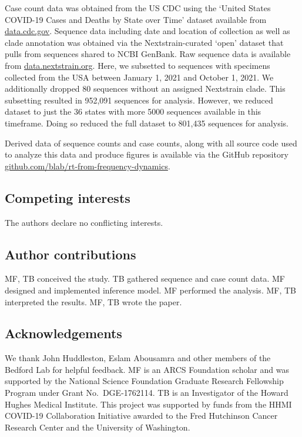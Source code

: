 \documentclass[11pt,oneside,letterpaper]{article}
\begin{document}
Case count data was obtained from the US CDC using the `United States COVID-19 Cases and Deaths by State over Time' dataset available from \href{https://data.cdc.gov/Case-Surveillance/United-States-COVID-19-Cases-and-Deaths-by-State-o/9mfq-cb36}{data.cdc.gov}.
Sequence data including date and location of collection as well as clade annotation was obtained via the Nextstrain-curated `open' dataset \cite{Hadfield2018} that pulls from sequences shared to NCBI GenBank.
Raw sequence data is available from \href{https://docs.nextstrain.org/projects/ncov/en/latest/reference/remote_inputs.html}{data.nextstrain.org}.
Here, we subsetted to sequences with specimens collected from the USA between January 1, 2021 and October 1, 2021.
We additionally dropped 80 sequences without an assigned Nextstrain clade.
This subsetting resulted in 952,091 sequences for analysis.
However, we reduced dataset to just the 36 states with more 5000 sequences available in this timeframe.
Doing so reduced the full dataset to 801,435 sequences for analysis.

Derived data of sequence counts and case counts, along with all source code used to analyze this data and produce figures is available via the GitHub repository \href{https://github.com/blab/rt-from-frequency-dynamics/}{github.com/blab/rt-from-frequency-dynamics}.

\subsection*{Competing interests}%

The authors declare no conflicting interests.

\subsection*{Author contributions}

MF, TB conceived the study.
TB gathered sequence and case count data.
MF designed and implemented inference model.
MF performed the analysis.
MF, TB interpreted the results.
MF, TB wrote the paper.

\subsection*{Acknowledgements}%

We thank John Huddleston, Eslam Abousamra and other members of the Bedford Lab for helpful feedback.
MF is an ARCS Foundation scholar and was supported by the National Science Foundation Graduate Research Fellowship Program under Grant No.\ DGE-1762114.
TB is an Investigator of the Howard Hughes Medical Institute.
This project was supported by funds from the HHMI COVID-19 Collaboration Initiative awarded to the Fred Hutchinson Cancer Research Center and the University of Washington.
\end{document}
